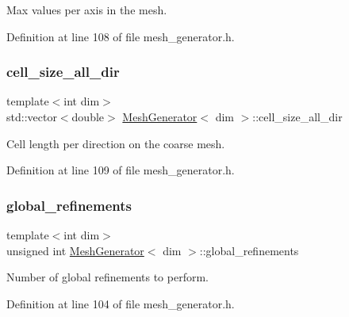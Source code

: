 Max values per axis in the mesh. 



Definition at line 108 of file mesh\+\_\+generator.\+h.

\mbox{\label{class_mesh_generator_a55a1699f8cdb9418486af6b0fa3487cc}} 
\subsubsection{\texorpdfstring{cell\+\_\+size\+\_\+all\+\_\+dir}{cell\_size\_all\_dir}}
{\footnotesize\ttfamily template$<$int dim$>$ \\
std\+::vector$<$double$>$ \hyperlink{class_mesh_generator}{Mesh\+Generator}$<$ dim $>$\+::cell\+\_\+size\+\_\+all\+\_\+dir\hspace{0.3cm}{\ttfamily [private]}}



Cell length per direction on the coarse mesh. 



Definition at line 109 of file mesh\+\_\+generator.\+h.

\mbox{\label{class_mesh_generator_af8fc6b25c91228ca1ccce7f1c7a2a526}} 
\subsubsection{\texorpdfstring{global\+\_\+refinements}{global\_refinements}}
{\footnotesize\ttfamily template$<$int dim$>$ \\
unsigned int \hyperlink{class_mesh_generator}{Mesh\+Generator}$<$ dim $>$\+::global\+\_\+refinements\hspace{0.3cm}{\ttfamily [private]}}



Number of global refinements to perform. 



Definition at line 104 of file mesh\+\_\+generator.\+h.

\mbox{\label{class_mesh_generator_a7d6e17f844b8026a062b93ae12b1ee40}} 
